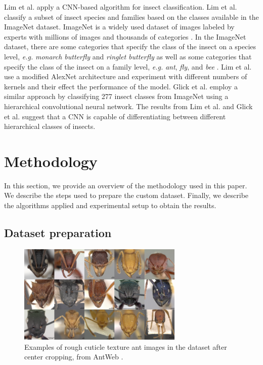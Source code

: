 \documentclass{aci}
\numberwithin{equation}{section}
\begin{document}
Lim et al. \cite{lim_performance_2017} apply a CNN-based algorithm for insect
classification. Lim et al. \cite{lim_performance_2017} classify a subset of
insect species and families based on the classes available in the ImageNet
dataset. ImageNet is a widely used dataset of images labeled by experts with
millions of images and thousands of categories \cite{deng_imagenet_2009}. In the
ImageNet dataset, there are some categories that specify the class of the insect
on a species level, \textit{e.g.} \textit{monarch butterfly} and \textit{ringlet
    butterfly} as well as some categories that specify the class of the insect on a
family level, \textit{e.g.} \textit{ant}, \textit{fly}, and \textit{bee}
\cite{deng_imagenet_2009}. Lim et al. \cite{lim_performance_2017} use a modified
AlexNet architecture and experiment with different numbers of kernels and their
effect the performance of the model. Glick et al. \cite{glick_insect_2016}
employ a similar approach by classifying 277 insect classes from ImageNet using
a hierarchical convolutional neural network. The results from Lim et al.
\cite{lim_performance_2017} and Glick et al. \cite{glick_insect_2016} suggest
that a CNN is capable of differentiating between different hierarchical classes
of insects.

\section{Methodology}

In this section, we provide an overview of the methodology used in this paper.
We describe the steps used to prepare the custom dataset. Finally, we describe
the algorithms applied and experimental setup to obtain the results.

\subsection{Dataset preparation} %

\begin{figure}[h]
    \centering
    \includegraphics[width=0.7\textwidth]{thesis_assets/images/rough_collage.png}
    \caption{Examples of rough cuticle texture ant images in the dataset after
        center cropping, from AntWeb \cite{perrichot_antweb_2012}.}
    \label{fig:rough-cuticle-texture}
\end{figure}
\end{document}
